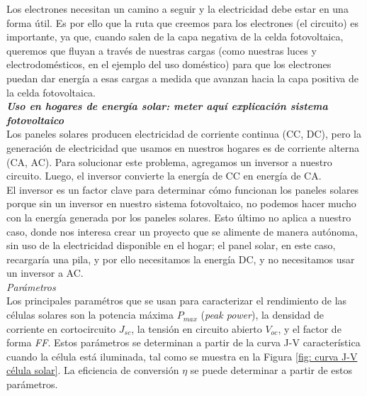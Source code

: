 \documentclass[12pt]{article}
\begin{document}
	\pagebreak
	
	\noindent Los electrones necesitan un camino a seguir y la electricidad debe estar en una forma útil. Es por ello que la ruta que creemos para los electrones (el circuito) es importante, ya que, cuando salen de la capa negativa de la celda fotovoltaica, queremos que fluyan a través de nuestras cargas (como nuestras luces y electrodomésticos, en el ejemplo del uso doméstico) para que los electrones puedan dar energía a esas cargas a medida que avanzan hacia la capa positiva de la celda fotovoltaica. \\
	
	\noindent \textit{\textbf{Uso en hogares de energía solar: meter aquí explicación sistema fotovoltaico}} \\
	
	\noindent Los paneles solares producen electricidad de corriente continua (CC, DC), pero la generación de electricidad que usamos en nuestros hogares es de corriente alterna (CA, AC). Para solucionar este problema, agregamos un inversor a nuestro circuito. Luego, el inversor convierte la energía de CC en energía de CA. \\
	
	\noindent El inversor es un factor clave para determinar cómo funcionan los paneles solares porque sin un inversor en nuestro sistema fotovoltaico, no podemos hacer mucho con la energía generada por los paneles solares. Esto último no aplica a nuestro caso, donde nos interesa crear un proyecto que se alimente de manera autónoma, sin uso de la electricidad disponible en el hogar; el panel solar, en este caso, recargaría una pila, y por ello necesitamos la energía DC, y no necesitamos usar un inversor a AC. \\ 
	
	\noindent \textit{Parámetros}\\
	
	\noindent Los principales paramétros que se usan para caracterizar el rendimiento de las células solares son la potencia máxima $P_{max}$ (\textit{peak power}), la densidad de corriente en cortocircuito $J_{sc}$, la tensión en circuito abierto $V_{oc}$, y el factor de forma \textit{FF}. Estos parámetros se determinan a partir de la curva J-V característica cuando la célula está iluminada, tal como se muestra en la Figura \ref{fig: curva J-V célula solar}. La eficiencia de conversión $\eta$ se puede determinar a partir de estos parámetros. \\
	
\end{document}
